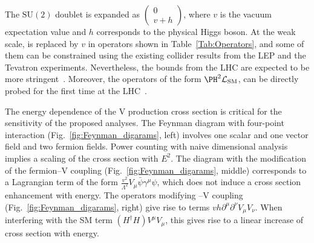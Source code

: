 \documentclass[a4paper,11pt]{article}
\renewcommand{\PV}{{{{V}}}\xspace}
\newcommand{\VH}{{{\PV}{\PH}}\xspace}
\begin{document}
The $\textrm{SU}(2)$ doublet \PH is expanded as $\begin{pmatrix} 0 \\ v+h \end{pmatrix}$, where $v$ is the vacuum expectation value  and $h$ corresponds to the physical Higgs boson.
At the weak scale,  \PH is replaced by $v$ in operators shown in Table~\ref{Tab:Operators}, and some of them can be constrained using the existing collider results from  the LEP and the Tevatron experiments.
Nevertheless, the bounds from the LHC are expected to be more stringent~\cite{Ellis:2014jta,Grojean:2018dqj}.
Moreover, the operators of the form ${\PH}^2\mathcal{L}_{\text{SM}}$, can be directly probed for the first time at the LHC~\cite{Gupta:2014rxa}. 

The energy dependence of the \VH production cross section is critical for the sensitivity of the proposed analyses. 
The Feynman diagram with four-point interaction (Fig.~\ref{fig:Feynman_digarams}, left) involves one scalar and one vector field and two fermion fields.
Power counting with naive dimensional analysis~\cite{Manohar:1983md} implies a scaling of the cross section with $E^2$. 
The diagram with the modification of the fermion--{\PV} coupling (Fig.~\ref{fig:Feynman_digarams}, middle) 
corresponds to a Lagrangian term  of the form $\frac{v^2}{{\Lambda}^2} V_{\mu} \bar{\psi} {{\gamma}^{\mu}} {\psi}$, which does not induce a cross section enhancement with energy. 
The operators modifying \PH--\PV coupling (Fig.~\ref{fig:Feynman_digarams}, right) give rise to terms $vh {\partial}^{\mu}{\partial}^{\nu} V_{\mu}V_{\nu}$.
When interfering with the SM term $(H^{\dagger}H) V^{\mu}V_{\mu}$, this gives rise to a linear increase of cross section with energy.
\end{document}
